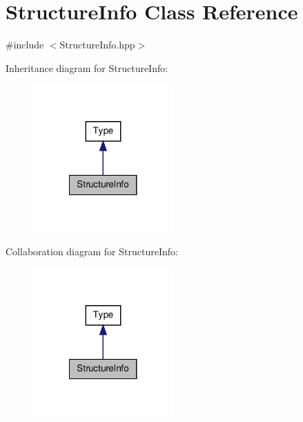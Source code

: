 \hypertarget{class_structure_info}{\section{Structure\-Info Class Reference}
\label{class_structure_info}
}


{\ttfamily \#include $<$Structure\-Info.\-hpp$>$}



Inheritance diagram for Structure\-Info\-:
\nopagebreak
\begin{figure}[H]
\begin{center}
\leavevmode
\includegraphics[width=152pt]{class_structure_info__inherit__graph}
\end{center}
\end{figure}


Collaboration diagram for Structure\-Info\-:
\nopagebreak
\begin{figure}[H]
\begin{center}
\leavevmode
\includegraphics[width=152pt]{class_structure_info__coll__graph}
\end{center}
\end{figure}
